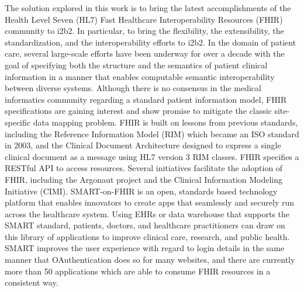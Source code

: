 \documentclass{amia}
\begin{document}
The solution explored in this work is to bring the latest accomplishments of the Health Level Seven (HL7) Fast Healthcare Interoperability Resources (FHIR) community to i2b2. In particular, to bring the flexibility, the extensibility, the standardization, and the interoperability efforts to i2b2. In the domain of patient care, several large-scale efforts have been underway for over a decade with the goal of specifying both the structure and the semantics of patient clinical information in a manner that enables computable semantic interoperability between diverse systems. Although there is no consensus in the medical informatics community regarding a standard patient information model, FHIR specifications are gaining interest and show promise to mitigate the classic site-specific data mapping problem. FHIR is built on lessons\cite{Rosenbloom_2017} from previous standards, including the Reference Information Model (RIM) which became an ISO standard in 2003, and the Clinical Document Architecture designed to express a single clinical document as a message using HL7 version 3 RIM classes. FHIR specifies a RESTful API to access resources. Several initiatives facilitate the adoption of FHIR, including the Argonaut project\cite{argo} and the Clinical Information Modeling Initiative (CIMI)\cite{cimi}. 
SMART-on-FHIR\cite{smarton} is an open, standards based technology platform that enables innovators to create apps that seamlessly and securely run across the healthcare system. Using EHRs or data warehouse that supports the SMART standard, patients, doctors, and healthcare practitioners can draw on this library of applications to improve clinical care, research, and public health. SMART improves the user experience with regard to login details in the same manner that OAuthentication does so for many websites, and there are currently more than 50 applications which are able to consume FHIR resources in a consistent way.
\end{document}
